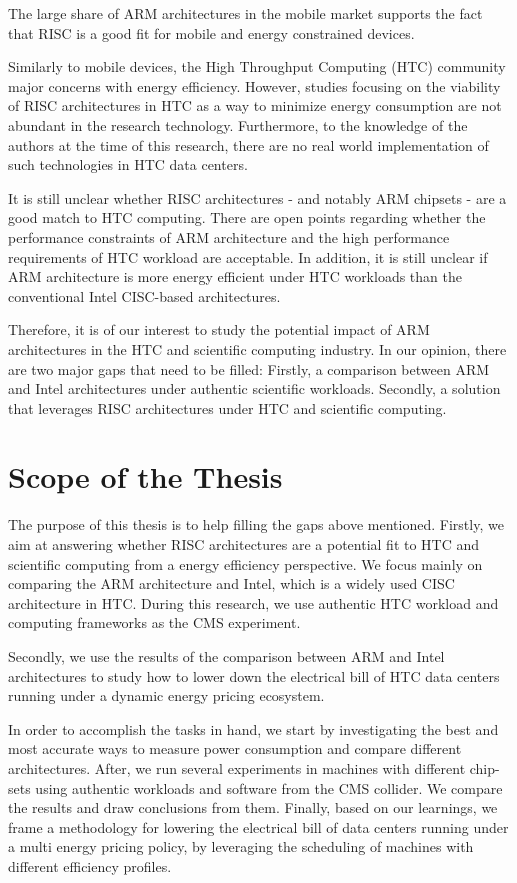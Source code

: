 The large share of ARM architectures in the mobile market supports the fact that
RISC is a good fit for mobile and energy constrained devices.


Similarly to mobile devices, the High Throughput Computing (HTC) community major concerns with energy efficiency. However, studies focusing on the viability 
of RISC architectures in HTC as a way to minimize energy consumption are not
abundant in the research technology. Furthermore, to the knowledge of the
authors at the time of this research, there are no real world implementation of such technologies in 
HTC data centers.



It is still unclear whether RISC architectures - and notably ARM chipsets - are a good match to HTC
computing. There are open points regarding whether the performance 
constraints of ARM architecture and the high performance requirements of HTC 
workload are acceptable. In addition, it is still unclear if ARM architecture
is more energy efficient under HTC workloads than the conventional Intel CISC-based architectures.

Therefore, it is of our interest to study the potential impact of ARM architectures in 
the HTC and scientific computing industry. In our opinion, there are two major
gaps that need to be filled: Firstly, a comparison between
ARM and Intel architectures under authentic scientific workloads. Secondly,
a solution that leverages RISC architectures under HTC and scientific
computing.
 

\section{Scope of the Thesis}
The purpose of this thesis is to help filling the gaps above mentioned. Firstly, we aim at answering whether RISC architectures
are a potential fit to HTC and scientific computing from a energy efficiency
perspective. We focus mainly on comparing the ARM architecture and Intel, which is a widely used CISC architecture in HTC. During this research, we
use authentic HTC workload and computing frameworks as the CMS experiment. 

Secondly, we use the results of the comparison between ARM and Intel architectures to study how to lower down the electrical bill of HTC data centers running under a dynamic energy
pricing ecosystem.


In order to accomplish the tasks in hand, we start by investigating the best
and most accurate ways to measure power consumption and compare different
architectures. After, we run several experiments in machines with different chip-sets using
authentic workloads and software from the CMS collider. We compare the results and
draw conclusions from them. Finally, based on our learnings, we frame a methodology for
lowering the electrical bill of data centers running under a multi energy
pricing policy, by leveraging the scheduling of machines with different
efficiency profiles.  

